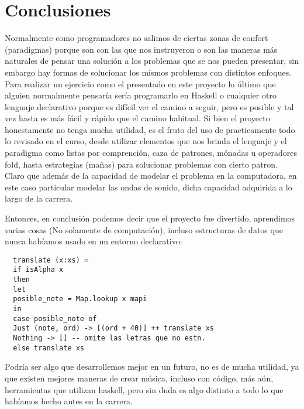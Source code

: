 \documentclass[10pt,a4paper]{article}
\begin{document}
\section{Conclusiones}
\noindent Normalmente como programadores no salimos de ciertas zonas de confort
(paradigmas) porque son con las que nos instruyeron o son las maneras más
naturales de pensar una solución a los problemas que se nos pueden presentar, sin
embargo hay formas de solucionar los mismos problemas con distintos enfoques.
Para realizar un ejercicio como el presentado en este proyecto lo último que
alguien normalmente pensaría sería programarlo en Haskell o cualquier otro
lenguaje declarativo porque es difícil ver el camino a seguir, pero es posible y
tal vez hasta es más fácil y rápido que el camino habitual. Si bien el proyecto
honestamente no tenga mucha utilidad, es el fruto del uso de practicamente todo
lo revisado en el curso, desde utilizar elementos que nos brinda el lenguaje y el
paradigma como listas por comprención, caza de patrones, mónadas u operadores
fold, hasta estrategias (mañas) para solucionar problemas con cierto patron.
Claro que además de la capacidad de modelar el problema en la computadora, en
este caso particular modelar las ondas de sonido, dicha capacidad adquirida a lo
largo de la carrera.

Entonces, en conclusión podemos decir que el proyecto fue divertido, aprendimos
varias cosas (No solamente de computación), incluso estructuras de datos que
nunca habíamos usado en un entorno declarativo:

\begin{verbatim}
  translate (x:xs) =
  if isAlpha x
  then
  let
  posible_note = Map.lookup x mapi
  in
  case posible_note of
  Just (note, ord) -> [(ord + 40)] ++ translate xs
  Nothing -> [] -- omite las letras que no estn.
  else translate xs
\end{verbatim}

Podría ser algo que desarrollemos mejor en un futuro, no es de mucha utilidad,
ya que existen mejores maneras de crear música, incluso con código, más aún,
herramientas que utilizan haskell\cite{tidal}, pero sin duda es algo distinto a
todo lo que habíamos hecho antes en la carrera.

 {
  \nocite{paul}
  \nocite{tidal}
  \nocite{u2}
  \nocite{otro}
}

\end{document}
